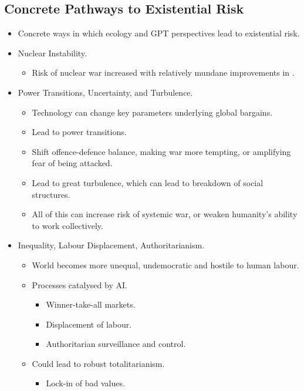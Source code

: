 \subsection{Concrete Pathways to Existential Risk}

\begin{itemize}
    \item Concrete ways in which ecology and GPT perspectives lead to existential risk.
    \item Nuclear Instability.
    \begin{itemize}
        \item Risk of nuclear war increased with relatively mundane improvements in .
    \end{itemize}
    \item Power Transitions, Uncertainty, and Turbulence.
    \begin{itemize}
        \item Technology can change key parameters underlying global bargains.
        \item Lead to power transitions.
        \item Shift offence-defence balance, making war more tempting, or amplifying fear of being attacked.
        \item Lead to great turbulence, which can lead to breakdown of social structures.
        \item All of this can increase risk of systemic war, or weaken humanity's ability to work collectively.
    \end{itemize}
    \item Inequality, Labour Displacement, Authoritarianism.
    \begin{itemize}
        \item World becomes more unequal, undemocratic and hostile to human labour.
        \item Processes catalysed by AI.
        \begin{itemize}
            \item Winner-take-all markets.
            \item Displacement of labour.
            \item Authoritarian surveillance and control.
        \end{itemize}
        \item Could lead to robust totalitarianism.
        \begin{itemize}
            \item Lock-in of bad values.

\end{itemize}
\end{itemize}
\end{itemize}
